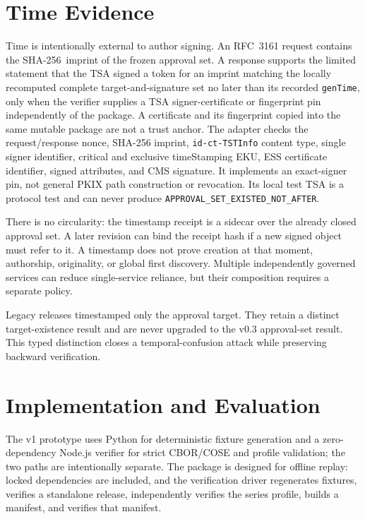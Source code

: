 \documentclass[11pt]{article}
\newcommand{\sha}{\textsf{SHA-256}}
\begin{document}
\section{Time Evidence}

Time is intentionally external to author signing. An RFC~3161 request contains
the \sha\ imprint of the frozen approval set. A response supports the limited
statement that the TSA signed a token for an imprint matching the locally
recomputed complete target-and-signature set no later than its recorded
\texttt{genTime}, only when the verifier supplies a TSA signer-certificate or
fingerprint pin independently of the package. A certificate and its fingerprint
copied into the same mutable package are not a trust anchor. The adapter checks
the request/response nonce, SHA-256 imprint, \texttt{id-ct-TSTInfo} content type,
single signer identifier, critical and exclusive timeStamping EKU, ESS
certificate identifier, signed attributes, and CMS signature. It implements an
exact-signer pin, not general PKIX path construction or revocation. Its local
test TSA is a protocol test and can never produce
\texttt{APPROVAL\_SET\_EXISTED\_NOT\_AFTER}.

There is no circularity: the timestamp receipt is a sidecar over the already
closed approval set. A later revision can bind the receipt hash if a new signed object
must refer to it. A timestamp does not prove creation at that moment,
authorship, originality, or global first discovery. Multiple independently
governed services can reduce single-service reliance, but their composition
requires a separate policy.

Legacy releases timestamped only the approval target. They retain a distinct
target-existence result and are never upgraded to the v0.3 approval-set result.
This typed distinction closes a temporal-confusion attack while preserving
backward verification.

\section{Implementation and Evaluation}

The v1 prototype uses Python for deterministic fixture generation and a zero-dependency Node.js verifier for strict CBOR/COSE and profile validation; the two paths are intentionally separate. The package is designed for offline replay: locked dependencies are included, and the verification driver regenerates fixtures, verifies a standalone release, independently verifies the series profile, builds a manifest, and verifies that manifest.
\end{document}
